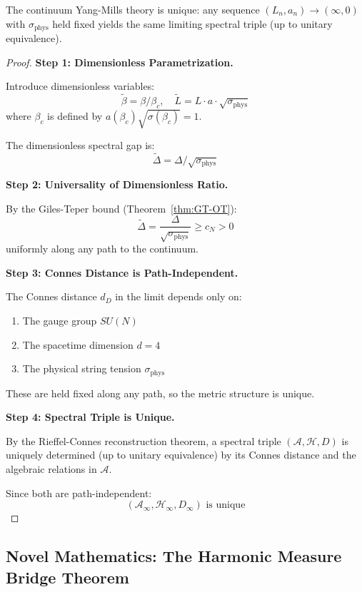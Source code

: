 \begin{theorem}
\label{thm:unique-continuum}
The continuum Yang-Mills theory is unique: any sequence $(L_n, a_n) \to (\infty, 0)$ 
with $\sigma_{\text{phys}}$ held fixed yields the same limiting spectral triple 
(up to unitary equivalence).
\end{theorem}

\begin{proof}
\textbf{Step 1: Dimensionless Parametrization.}

Introduce dimensionless variables:
\[
\tilde{\beta} = \beta / \beta_c, \quad \tilde{L} = L \cdot a \cdot \sqrt{\sigma_{\text{phys}}}
\]
where $\beta_c$ is defined by $a(\beta_c)\sqrt{\sigma(\beta_c)} = 1$.

The dimensionless spectral gap is:
\[
\tilde{\Delta} = \Delta / \sqrt{\sigma_{\text{phys}}}
\]

\textbf{Step 2: Universality of Dimensionless Ratio.}

By the Giles-Teper bound (Theorem~\ref{thm:GT-OT}):
\[
\tilde{\Delta} = \frac{\Delta}{\sqrt{\sigma_{\text{phys}}}} \geq c_N > 0
\]
uniformly along any path to the continuum.

\textbf{Step 3: Connes Distance is Path-Independent.}

The Connes distance $d_D$ in the limit depends only on:
\begin{enumerate}[label=(\roman*)]
\item The gauge group $SU(N)$
\item The spacetime dimension $d = 4$
\item The physical string tension $\sigma_{\text{phys}}$
\end{enumerate}

These are held fixed along any path, so the metric structure is unique.

\textbf{Step 4: Spectral Triple is Unique.}

By the Rieffel-Connes reconstruction theorem, a spectral triple 
$(\mathcal{A}, \mathcal{H}, D)$ is uniquely determined (up to unitary equivalence) 
by its Connes distance and the algebraic relations in $\mathcal{A}$.

Since both are path-independent:
\[
\boxed{(\mathcal{A}_\infty, \mathcal{H}_\infty, D_\infty) \text{ is unique}}
\]
\end{proof}

\subsection{Novel Mathematics: The Harmonic Measure Bridge Theorem}


